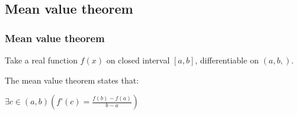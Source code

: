 
\subsection{Mean value theorem}

\subsubsection{Mean value theorem}

Take a real function \(f(x)\) on closed interval \([a,b]\), differentiable on \((a,b,)\).

The mean value theorem states that:

$\exists c\in(a,b) (f’(c)=\frac{f(b)-f(a)}{b-a})$

